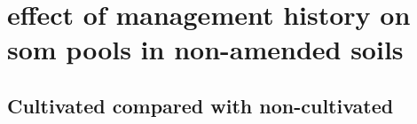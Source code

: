 



\section{effect of management history on \gls{som} pools in non-amended soils}

	\subsection{Cultivated compared with non-cultivated}
